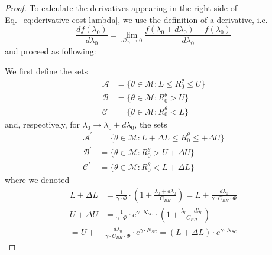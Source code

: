 \documentclass[10pt,conference,letterpaper]{IEEEtran}
\newcommand{\eq}[1]{Eq.~\eqref{#1}}
\begin{document}
\begin{proof}
To calculate the derivatives appearing in the right side of \eq{eq:derivative-cost-lambda}, we use the definition of a derivative, i.e.
\begin{equation}
 \frac{df(\lambda_{0})}{d\lambda_{0}} = \lim_{d\lambda_{0}\rightarrow 0}\frac{f(\lambda_{0}+d\lambda_{0})-f(\lambda_{0})}{d\lambda_{0}}
\end{equation}
and proceed as following:

We first define the sets
\begin{subequations}
 \begin{align}
 \mathcal{A} &= \lbrace\theta\in\mathcal{M}:L\leq R_{0}^{\theta}\leq U\rbrace\\
\mathcal{B} &= \lbrace\theta\in\mathcal{M}: R_{0}^{\theta}> U\rbrace\\
\mathcal{C} &= \lbrace\theta\in\mathcal{M}: R_{0}^{\theta}< L\rbrace
\end{align}
\end{subequations}
and, respectively, for $\lambda_{0}\rightarrow \lambda_{0}+d\lambda_{0}$, the sets
\begin{subequations}
 \begin{align}
 \mathcal{A}^{'} &= \lbrace\theta\in\mathcal{M}:L+\Delta L \leq R_{0}^{\theta}\leq +\Delta U\rbrace\\
\mathcal{B}^{'} &= \lbrace\theta\in\mathcal{M}: R_{0}^{\theta}> U+\Delta U \rbrace\\
\mathcal{C}^{'} &= \lbrace\theta\in\mathcal{M}: R_{0}^{\theta}< L+\Delta L \rbrace
\end{align}
\end{subequations}
where we denoted
\begin{subequations}\label{eqs:delta-L-U-definitions}
 \begin{align}
L+ \Delta L &= \frac{1}{\gamma\cdot\Phi}\cdot \left(1+\frac{\lambda_{0}+d\lambda_{0}}{C_{BH}}\right) = L + \frac{d\lambda_{0}}{\gamma\cdot C_{BH}\cdot \Phi}\\
U+ \Delta U&= \frac{1}{\gamma\cdot\Phi}\cdot e^{\gamma\cdot N_{SC}}\cdot \left(1+\frac{\lambda_{0}+d\lambda_{0}}{C_{BH}}\right) \nonumber\\
	   = U + &\frac{d\lambda_{0}}{\gamma\cdot C_{BH}\cdot \Phi}\cdot e^{\gamma\cdot N_{SC}} = (L+\Delta L)\cdot e^{\gamma\cdot N_{SC}}
\end{align}
\end{subequations}


\end{proof}
\end{document}
